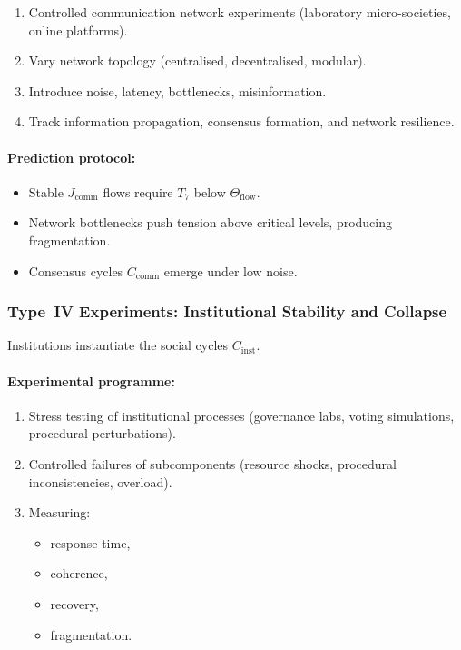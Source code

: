 \begin{enumerate}
    \item Controlled communication network experiments 
          (laboratory micro-societies, online platforms).
    \item Vary network topology (centralised, decentralised, modular).
    \item Introduce noise, latency, bottlenecks, misinformation.
    \item Track information propagation, consensus formation, 
          and network resilience.
\end{enumerate}

\paragraph{Prediction protocol:}

\begin{itemize}
    \item Stable $J_{\mathrm{comm}}$ flows require $T_7$ below 
          $\Theta_{\mathrm{flow}}$.
    \item Network bottlenecks push tension above critical levels,
          producing fragmentation.
    \item Consensus cycles $C_{\mathrm{comm}}$ emerge under low noise.
\end{itemize}



\subsubsection{Type~IV Experiments: Institutional Stability and Collapse}

Institutions instantiate the social cycles $C_{\mathrm{inst}}$.

\paragraph{Experimental programme:}

\begin{enumerate}
    \item Stress testing of institutional processes (governance labs,
          voting simulations, procedural perturbations).
    \item Controlled failures of subcomponents (resource shocks, 
          procedural inconsistencies, overload).
    \item Measuring:
          \begin{itemize}
              \item response time,
              \item coherence,
              \item recovery,
              \item fragmentation.
          \end{itemize}
\end{enumerate}

